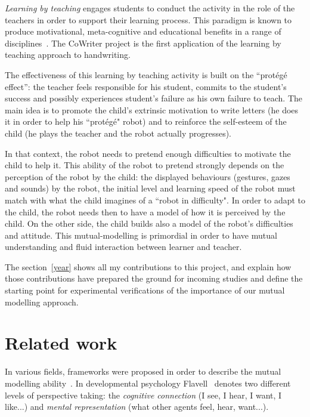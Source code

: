 \documentclass[10pt,a4paper]{article}
\begin{document}
\emph{Learning by teaching} engages students to conduct the activity in the role of the teachers in order to support their learning process. 
This  paradigm is known to produce motivational, meta-cognitive and educational benefits in a range of disciplines~\cite{Rohrbeck2003}. 
The CoWriter project is the first application of the learning by teaching approach to handwriting.

The effectiveness of this learning by teaching activity is built on the ``prot\'eg\'e effect'': the teacher feels responsible for his student, commits to the student's success and possibly experiences student's failure as his own failure to teach. 
The main idea is to promote the child's extrinsic motivation to write letters (he does it in order to help his ``prot\'eg\'e" robot) and to reinforce the self-esteem of the child (he plays the teacher and the robot actually progresses).

In that context, the robot needs to pretend enough difficulties to motivate the child to help it. 
This ability of the robot to pretend strongly depends on the perception of the robot by the child: the displayed behaviours (gestures, gazes and sounds) by the robot, the initial level and learning speed of the robot must match with what the child imagines of a ``robot in difficulty".
In order to adapt to the child, the robot needs then to have a model of how it is perceived by the child. On the other side, the child builds also a model of the robot's difficulties and attitude. 
This mutual-modelling is primordial in order to have mutual understanding and fluid interaction between learner and teacher. 

The section~\ref{year} shows all my contributions to this project, and explain how those contributions have prepared the ground for incoming studies and define the starting point for experimental verifications of the importance of our mutual modelling approach.

\section{Related work}\label{rw}


In various fields, frameworks were proposed in order to describe the mutual modelling ability~\cite{lemaignan2015mutual}. 
In developmental psychology Flavell~\cite{flavell1990developmental} denotes two different levels of perspective taking: the \textit{cognitive connection} (I see, I hear, I want, I like...) and \textit{mental representation} (what other agents feel, hear, want...).
\end{document}
